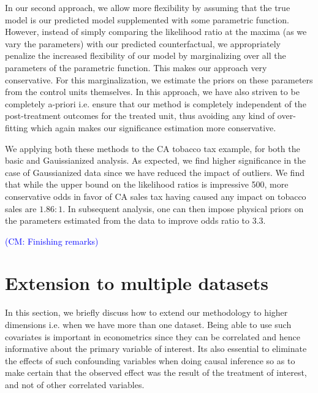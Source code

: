 \documentclass{article}
\newcommand\CM[1]{\textcolor{blue}{(CM: #1)}}
\begin{document}
In our second approach, we allow more flexibility by assuming that the true model is our predicted model supplemented with some parametric function. However, instead of simply comparing the likelihood ratio at the maxima (as we vary the parameters) with our predicted counterfactual, we appropriately penalize the increased flexibility of our model by marginalizing over all the parameters of the parametric function. This makes our approach very conservative. For this marginalization, we estimate the priors on these parameters from the control units themselves. In this approach, we have also striven to be completely a-priori i.e. ensure that our method is completely independent of the post-treatment outcomes for the treated unit, thus avoiding any kind of over-fitting which again makes our significance estimation more conservative. 

We applying both these methods to the CA tobacco tax example, for both the basic and Gauissianized analysis. As expected, we find higher significance in the case of Gaussianized data since we have reduced the impact of outliers. We find that while the upper bound on the likelihood ratios is impressive 500, more conservative odds in favor of CA sales tax having caused any impact on tobacco sales are $1.86:1$. In subsequent analysis, one can then impose physical priors on the parameters estimated from the data to improve odds ratio to $3.3$.

\CM{Finishing remarks}



  


\appendix
\section{Extension to multiple datasets}
\label{app:covariates}
In this section, we briefly discuss how to extend our methodology to higher dimensions i.e. when we have more than one dataset. Being able to use such covariates is important in econometrics since they can be correlated and hence informative about the primary variable of interest. Its also essential to eliminate the effects of such confounding variables when doing causal inference so as to make certain that the observed effect was the result of the treatment of interest, and not of other correlated variables. 
\end{document}
